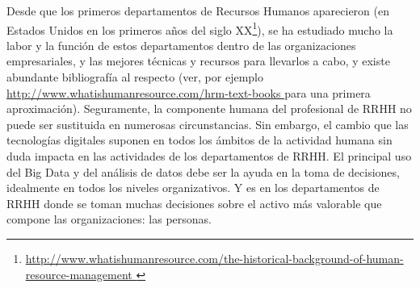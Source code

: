 Desde que los primeros departamentos de Recursos Humanos aparecieron (en Estados Unidos
en los primeros años del siglo XX\footnote{\url{http://www.whatishumanresource.com/the-historical-background-of-human-resource-management }}),
se ha estudiado mucho la labor y la función de estos departamentos dentro de las organizaciones
empresariales, y las mejores técnicas y recursos para llevarlos a cabo, y existe abundante bibliografía
al respecto (ver, por ejemplo \url{http://www.whatishumanresource.com/hrm-text-books } para una
primera aproximación). Seguramente, la componente humana del profesional de RRHH no puede ser sustituida
en numerosas circunstancias. Sin embargo, el cambio que las tecnologías digitales
suponen en todos los ámbitos de la actividad humana sin duda impacta en las
actividades de los departamentos de RRHH. El principal uso del Big Data y del análisis
de datos debe ser la ayuda en la toma de decisiones, idealmente en todos los niveles
organizativos. Y es en los departamentos de RRHH donde se toman muchas decisiones sobre el
activo más valorable que compone las organizaciones: las personas.

